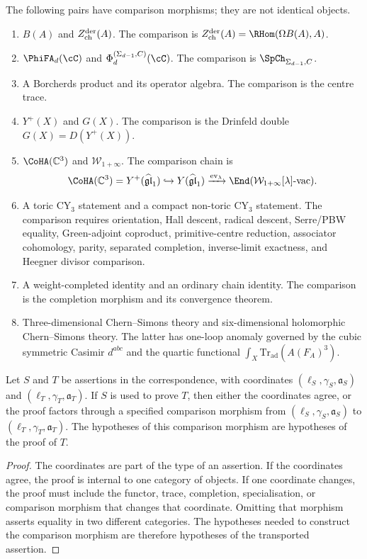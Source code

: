 The following pairs have comparison morphisms; they are not identical
objects.
\begin{enumerate}[label=\textup{(\roman*)}, leftmargin=*]
\item \(B(A)\) and \(Z^{\mathrm{der}}_{\mathrm{ch}}(A)\).  The comparison is
  \(\Zder(A)=\RHom(\Omega B(A),A)\).
\item \(\PhiFA_d(\cC)\) and
  \(\Phi_d^{(\Sigma_{d-1},C)}(\cC)\).  The comparison is
  \(\SpCh_{\Sigma_{d-1},C}\).
\item A Borcherds product and its operator algebra.  The comparison is
  the centre trace.
\item \(Y^+(X)\) and \(G(X)\).  The comparison is the Drinfeld double
  \(G(X)=D(Y^+(X))\).
\item \(\CoHA(\mathbb C^3)\) and \(\mathcal W_{1+\infty}\).  The
  comparison chain is
  \[
  \CoHA(\mathbb C^3)=Y^+(\widehat{\mathfrak{gl}}_1)
  \hookrightarrow Y(\widehat{\mathfrak{gl}}_1)
  \xrightarrow{\mathrm{ev}_\lambda}
  \End(\mathcal W_{1+\infty}[\lambda]\text{-vac}).
  \]
\item A toric CY\(_3\) statement and a compact non-toric CY\(_3\)
  statement.  The comparison requires orientation, Hall descent,
  radical descent, Serre/PBW equality, Green-adjoint coproduct,
  primitive-centre reduction, associator cohomology, parity,
  separated completion, inverse-limit exactness, and Heegner divisor
  comparison.
\item A weight-completed identity and an ordinary chain identity.  The
  comparison is the completion morphism and its convergence theorem.
\item Three-dimensional Chern--Simons theory and six-dimensional
  holomorphic Chern--Simons theory.  The latter has one-loop anomaly
  governed by the cubic symmetric Casimir \(d^{abc}\) and the quartic
  functional \(\int_X\mathrm{Tr}_{\mathrm{ad}}(A(F_A)^3)\).
\end{enumerate}

\begin{proposition}
Let \(S\) and \(T\) be assertions in the correspondence, with
coordinates \((\ell_S,\gamma_S,\mathfrak a_S)\) and
\((\ell_T,\gamma_T,\mathfrak a_T)\).  If \(S\) is used to prove \(T\),
then either the coordinates agree, or the proof factors through a
specified comparison morphism from
\((\ell_S,\gamma_S,\mathfrak a_S)\) to
\((\ell_T,\gamma_T,\mathfrak a_T)\).  The hypotheses of this comparison
morphism are hypotheses of the proof of \(T\).
\end{proposition}

\begin{proof}
The coordinates are part of the type of an assertion.  If the
coordinates agree, the proof is internal to one category of objects.  If
one coordinate changes, the proof must include the functor, trace,
completion, specialisation, or comparison morphism that changes that
coordinate.  Omitting that morphism asserts equality in two different
categories.  The hypotheses needed to construct the comparison morphism
are therefore hypotheses of the transported assertion.
\end{proof}
